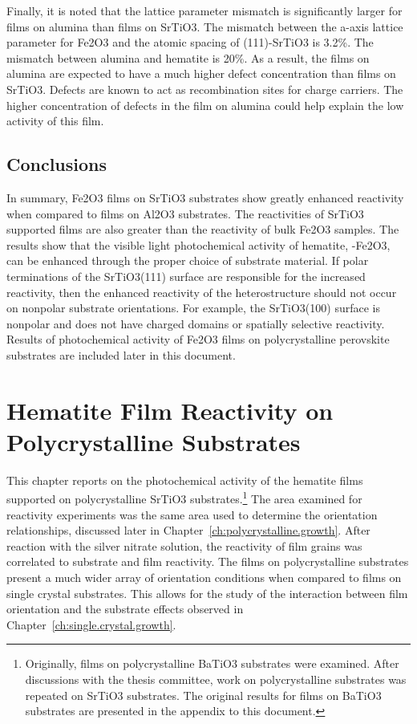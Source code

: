 \documentclass[12pt,%
              twoside,
               letterpaper]{uiothesis}
\begin{document}
Finally, it is noted that the lattice parameter mismatch is significantly larger for 
films on alumina than films on SrTiO3. The mismatch between the 
a-axis lattice parameter for Fe2O3 and the atomic spacing of 
(111)-SrTiO3 is 3.2\%. The mismatch between alumina and hematite is 
\texttildelow{}20\%. As a result, the films on alumina are expected to 
have a much higher defect concentration than films on SrTiO3. 
Defects are known to act as recombination sites for charge carriers. 
The higher concentration of defects in the film on alumina could help 
explain the low activity of this film.


\section{Conclusions}
\label{sec:single.crystal.conclusions}


In summary, Fe2O3 films on SrTiO3 substrates show greatly enhanced reactivity
when compared to films on Al2O3 substrates. The reactivities of SrTiO3 supported
films are also greater than the reactivity of bulk Fe2O3 samples.  The results show
that the visible light photochemical activity of hematite, \textalpha-Fe2O3, can be
enhanced through the proper choice of substrate material. If polar terminations of the
SrTiO3(111) surface are responsible for the increased reactivity, then the enhanced
reactivity of the heterostructure should not occur on nonpolar substrate orientations. 
For example, the SrTiO3(100) surface is nonpolar and does not have charged domains or
spatially selective reactivity.\cite{Giocondi:2003wc} Results of photochemical activity of
Fe2O3 films on polycrystalline perovskite substrates are included later in this
document.


\chapter{Hematite Film Reactivity on Polycrystalline Substrates}
\label{ch:polycrystalline.reactivity}


This chapter reports on the photochemical activity of the hematite films
supported on polycrystalline SrTiO3 substrates.\footnote{Originally, films on 
polycrystalline BaTiO3 substrates were examined. After discussions with the thesis 
committee, work on polycrystalline substrates was repeated on SrTiO3 substrates. The 
original results for films on BaTiO3 substrates are presented in the appendix to this 
document.} The area examined for reactivity
experiments was the same area used to determine the orientation relationships, discussed
later in Chapter~\ref{ch:polycrystalline.growth}. After reaction with the silver nitrate
solution, the reactivity of film grains was correlated to substrate and film reactivity.
The films on polycrystalline substrates present a much wider array of orientation
conditions when compared to films on single crystal substrates. This allows for the study
of the interaction between film orientation and the substrate effects observed in 
Chapter~\ref{ch:single.crystal.growth}.
\end{document}

